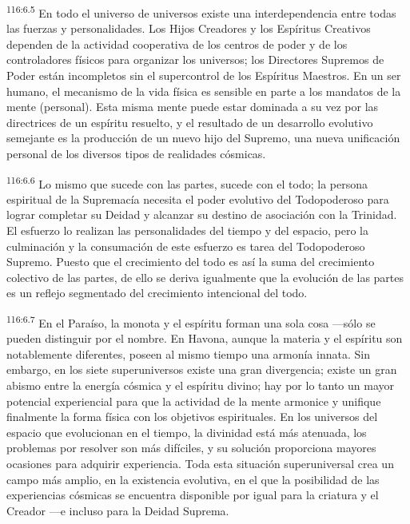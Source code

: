 \par
\textsuperscript{116:6.5} En todo el universo de universos existe una interdependencia entre todas las fuerzas y personalidades. Los Hijos Creadores y los Espíritus Creativos dependen de la actividad cooperativa de los centros de poder y de los controladores físicos para organizar los universos; los Directores Supremos de Poder están incompletos sin el supercontrol de los Espíritus Maestros. En un ser humano, el mecanismo de la vida física es sensible en parte a los mandatos de la mente (personal). Esta misma mente puede estar dominada a su vez por las directrices de un espíritu resuelto, y el resultado de un desarrollo evolutivo semejante es la producción de un nuevo hijo del Supremo, una nueva unificación personal de los diversos tipos de realidades cósmicas.

\par
\textsuperscript{116:6.6} Lo mismo que sucede con las partes, sucede con el todo; la persona espiritual de la Supremacía necesita el poder evolutivo del Todopoderoso para lograr completar su Deidad y alcanzar su destino de asociación con la Trinidad. El esfuerzo lo realizan las personalidades del tiempo y del espacio, pero la culminación y la consumación de este esfuerzo es tarea del Todopoderoso Supremo. Puesto que el crecimiento del todo es así la suma del crecimiento colectivo de las partes, de ello se deriva igualmente que la evolución de las partes es un reflejo segmentado del crecimiento intencional del todo.

\par
\textsuperscript{116:6.7} En el Paraíso, la monota y el espíritu forman una sola cosa ---sólo se pueden distinguir por el nombre. En Havona, aunque la materia y el espíritu son notablemente diferentes, poseen al mismo tiempo una armonía innata. Sin embargo, en los siete superuniversos existe una gran divergencia; existe un gran abismo entre la energía cósmica y el espíritu divino; hay por lo tanto un mayor potencial experiencial para que la actividad de la mente armonice y unifique finalmente la forma física con los objetivos espirituales. En los universos del espacio que evolucionan en el tiempo, la divinidad está más atenuada, los problemas por resolver son más difíciles, y su solución proporciona mayores ocasiones para adquirir experiencia. Toda esta situación superuniversal crea un campo más amplio, en la existencia evolutiva, en el que la posibilidad de las experiencias cósmicas se encuentra disponible por igual para la criatura y el Creador ---e incluso para la Deidad Suprema.

